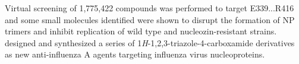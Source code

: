 \citep{1233} Virtual screening of 1,775,422 compounds was performed to target E339...R416 and some small molecules identified were shown to disrupt the formation of NP trimers and inhibit replication of wild type and nucleozin-resistant strains.
\citep{1516} designed and synthesized a series of 1\textit{H}-1,2,3-triazole-4-carboxamide derivatives as new anti-influenza A agents targeting influenza virus nucleoproteins.

